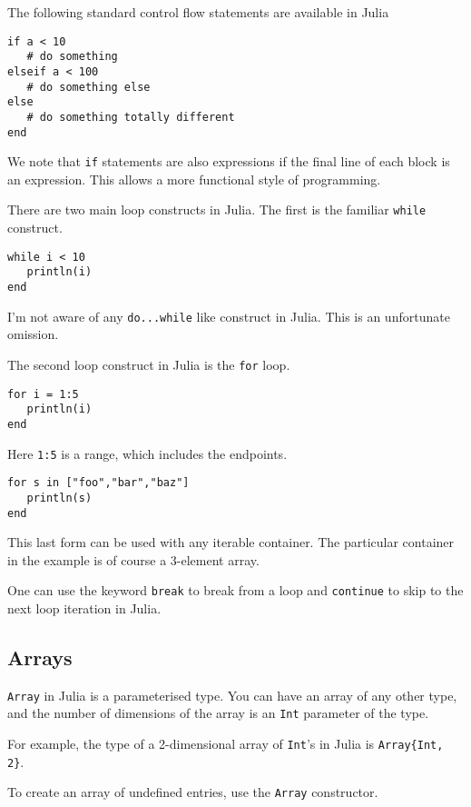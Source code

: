 \documentclass[a4paper,10pt]{article}
\newcommand{\code}{\lstinline}
\begin{document}
{The following standard control flow statements are available in Julia

\begin{lstlisting}
if a < 10
   # do something
elseif a < 100
   # do something else
else
   # do something totally different
end
\end{lstlisting}

We note that \code{if} statements are also expressions if the final line of each block is an expression.
This allows a more functional style of programming.

There are two main loop constructs in Julia. The first is the familiar \code{while} construct.

\begin{lstlisting}
while i < 10
   println(i)
end
\end{lstlisting}

I'm not aware of any \code{do...while} like construct in Julia. This is an unfortunate omission.

The second loop construct in Julia is the \code{for} loop.

\begin{lstlisting}
for i = 1:5
   println(i)
end
\end{lstlisting}

Here \code{1:5} is a range, which includes the endpoints.

\begin{lstlisting}
for s in ["foo","bar","baz"]
   println(s)
end
\end{lstlisting}

This last form can be used with any iterable container. The particular container in the example is
of course a 3-element array.

One can use the keyword \code{break} to break from a loop and \code{continue} to skip to the next
loop iteration in Julia.

\subsection{Arrays}

\code{Array} in Julia is a parameterised type. You can have an array of any other type, and the 
number of dimensions of the array is an \code{Int} parameter of the type.

For example, the type of a 2-dimensional array of \code{Int}'s in Julia is \code|Array{Int, 2}|.

To create an array of undefined entries, use the \code{Array} constructor.

}
\end{document}
